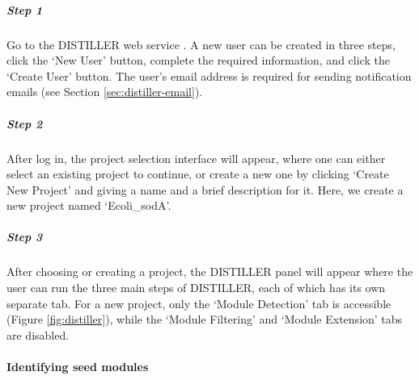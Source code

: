 \begin{small} %

\subparagraph{Step 1}	Go to the DISTILLER web service \cite{DISTILLER}.  A new user can be created in three steps, click the `New User' button, complete the required information, and click the `Create User' button.  The user's email address is required for sending notification emails (see Section \ref{sec:distiller-email}).

\subparagraph{Step 2}	After log in, the project selection interface will appear, where one can either select an existing project to continue, or create a new one by clicking `Create New Project' and giving a name and a brief description for it. Here, we create a new project named `Ecoli\_sodA'.  

\subparagraph{Step 3}	After choosing or creating a project, the DISTILLER  panel will appear where the user can run the three main steps of DISTILLER, each of which has its own separate tab. For a new project, only the `Module Detection' tab is accessible (Figure \ref{fig:distiller}), while the `Module Filtering' and `Module Extension' tabs are disabled.

\end{small} %



\paragraph{Identifying seed modules}


